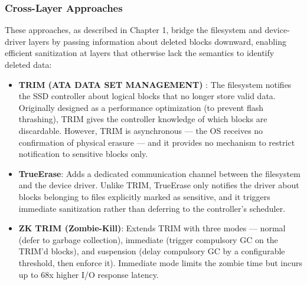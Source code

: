 \subsubsection{Cross-Layer Approaches}
These approaches, as described in Chapter 1, bridge the filesystem and device-driver layers by passing 
information about deleted blocks downward, enabling efficient sanitization at layers that otherwise 
lack the semantics to identify deleted data:
\begin{itemize}
    \item \textbf{ TRIM (ATA DATA SET MANAGEMENT)} : The filesystem notifies the SSD controller about 
    logical blocks that no longer store valid data. Originally designed as a performance optimization 
    (to prevent flash thrashing), TRIM gives the controller knowledge of which blocks are discardable. 
    However, TRIM is asynchronous — the OS receives no confirmation of physical erasure — and it provides 
    no mechanism to restrict notification to sensitive blocks only.

    \item \textbf{TrueErase}: Adds a dedicated communication channel between the filesystem and the device 
driver. Unlike TRIM, TrueErase only notifies the driver about blocks belonging to files explicitly marked 
as sensitive, and it triggers immediate sanitization rather than deferring to the controller's scheduler.

    \item \textbf{ZK TRIM (Zombie-Kill)}: Extends TRIM with three modes — normal (defer to garbage 
    collection), immediate (trigger compulsory GC on the TRIM'd blocks), and suspension (delay 
    compulsory GC by a configurable threshold, then enforce it). Immediate mode limits the zombie time 
    but incurs up to 68x higher I/O response latency.

\end{itemize}


